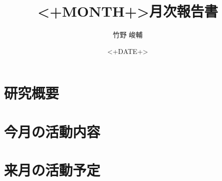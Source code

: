 \documentclass[twocolumn]{jsarticle}
\begin{document}
\title{<+MONTH+>月次報告書} 
\author{竹野 峻輔}
\date{<+DATE+>} 
\maketitle

\section{研究概要}

\section{今月の活動内容}

\section{来月の活動予定} 



\end{document}
